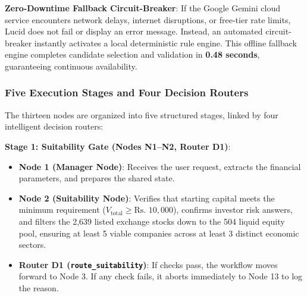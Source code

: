 \noindent \textbf{Zero-Downtime Fallback Circuit-Breaker}:
If the Google Gemini cloud service encounters network delays, internet disruptions, or free-tier rate limits, Lucid does not fail or display an error message. Instead, an automated circuit-breaker instantly activates a local deterministic rule engine. This offline fallback engine completes candidate selection and validation in \textbf{0.48 seconds}, guaranteeing continuous availability.

\subsubsection{Five Execution Stages and Four Decision Routers}
The thirteen nodes are organized into five structured stages, linked by four intelligent decision routers:

\noindent \textbf{Stage 1: Suitability Gate (Nodes N1--N2, Router D1)}:
\begin{itemize}
    \item \textbf{Node 1 (Manager Node)}: Receives the user request, extracts the financial parameters, and prepares the shared state.
    \item \textbf{Node 2 (Suitability Node)}: Verifies that starting capital meets the minimum requirement ($V_{\text{total}} \ge \text{Rs.~}10,000$), confirms investor risk answers, and filters the 2,639 listed exchange stocks down to the 504 liquid equity pool, ensuring at least 5 viable companies across at least 3 distinct economic sectors.
    \item \textbf{Router D1 (\texttt{route\_suitability})}: If checks pass, the workflow moves forward to Node 3. If any check fails, it aborts immediately to Node 13 to log the reason.
\end{itemize}

